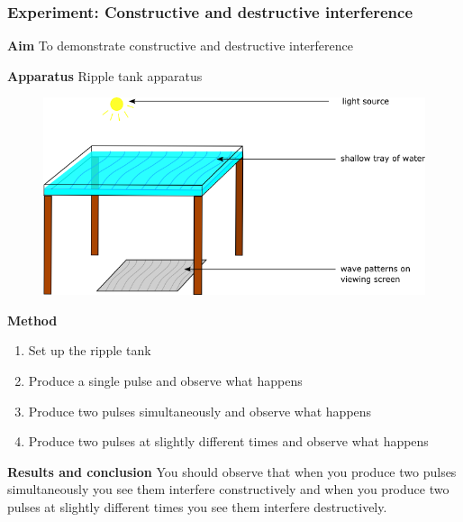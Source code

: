             \subsubsection{ Experiment: Constructive and destructive interference}
            \nopagebreak
            \label{m38802*eip-260}\noindent{}\textbf{Aim}
To demonstrate constructive and destructive interference
\par 
\label{m38802*eip7241}\noindent{}\textbf{Apparatus} 
Ripple tank apparatus
    \setcounter{subfigure}{0}
	\begin{figure}[H] %
    \begin{center}
    \label{m38802*id63458!!!underscore!!!media}\label{m38802*id63458!!!underscore!!!printimage}\includegraphics[width=0.8\columnwidth]{col11305.imgs/m38802_rippletray.png} %
      \vspace{2pt}
    \vspace{.1in}
    \end{center}
 \end{figure}       \par 
\label{m38802*eip7474}\noindent{}\textbf{Method}
\label{m38802*id6242}\begin{enumerate}[noitemsep, label=\textbf{\arabic*}. ] 
            \item Set up the ripple tank\item Produce a single pulse and observe what happens\item Produce two pulses simultaneously and observe what happens\item Produce two pulses at slightly different times and observe what happens\end{enumerate}
\par 
\label{m38802*id614134}\noindent{}\textbf{Results and conclusion}
You should observe that when you produce two pulses simultaneously you see them interfere constructively and when you produce two pulses at slightly different times you see them interfere destructively.
\par \label{m38802*secfhsst!!!underscore!!!id636}
